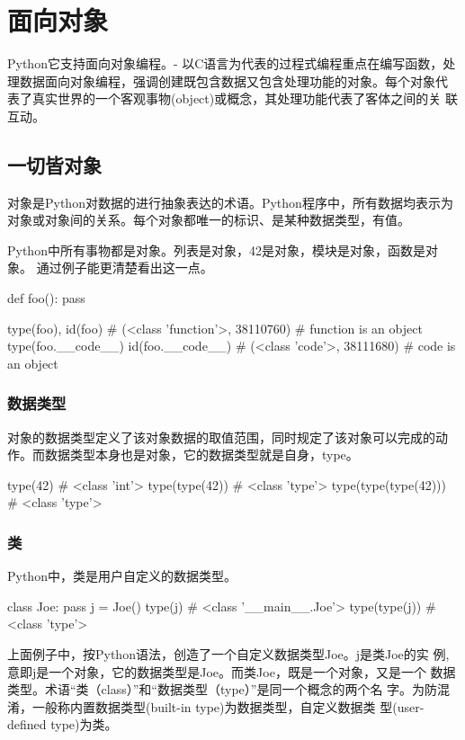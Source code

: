 \chapter{面向对象}
Python它支持面向对象编程。- 以C语言为代表的过程式编程重点在编写函数，处
理数据面向对象编程，强调创建既包含数据又包含处理功能的对象。每个对象代
表了真实世界的一个客观事物(object)或概念，其处理功能代表了客体之间的关
联互动。

\section{一切皆对象}
对象是Python对数据的进行抽象表达的术语。Python程序中，所有数据均表示为
对象或对象间的关系。每个对象都唯一的标识、是某种数据类型，有值。

Python中所有事物都是对象。列表是对象，42是对象，模块是对象，函数是对象。
通过例子能更清楚看出这一点。
\begin{python}
def foo(): pass

type(foo), id(foo)
# (<class 'function'>, 38110760)   #  function is an object
type(foo.__code__)
id(foo.__code__)
# (<class 'code'>, 38111680)  #  code is an object
\end{python}

\subsection{数据类型}
对象的数据类型定义了该对象数据的取值范围，同时规定了该对象可以完成的动
作。而数据类型本身也是对象，它的数据类型就是自身，type。
\begin{python}
type(42)
#  <class 'int'>
type(type(42))
#  <class 'type'>
type(type(type(42)))
#  <class 'type'>
\end{python}

\subsection{类}
Python中，类是用户自定义的数据类型。
\begin{python}
class Joe: 
    pass
j = Joe()
type(j)
# <class '__main__.Joe'>
type(type(j))
# <class 'type'>
\end{python}

上面例子中，按Python语法，创造了一个自定义数据类型Joe。j是类Joe的实
例,意即j是一个对象，它的数据类型是Joe。而类Joe，既是一个对象，又是一个
数据类型。术语“类（class）”和“数据类型（type）”是同一个概念的两个名
字。为防混淆，一般称内置数据类型(built-in type)为数据类型，自定义数据类
型(user-defined type)为类。

